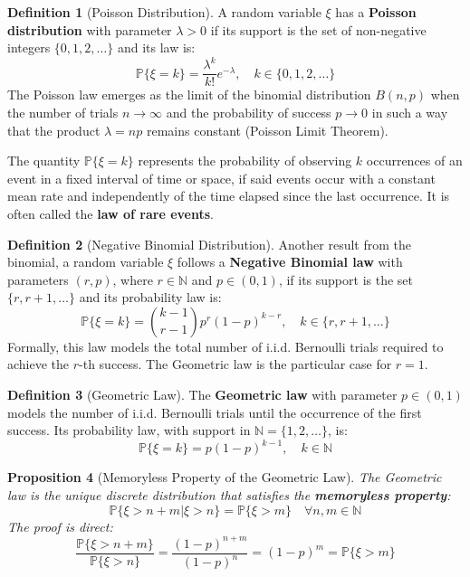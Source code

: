 \documentclass[12pt, openany]{book}
\theoremstyle{definition}
\newtheorem{definition}{Definition}[section]
\theoremstyle{plain}
\newtheorem{proposition}[definition]{Proposition}
\theoremstyle{remark}
\newcommand{\N}{\mathbb{N}}
\newcommand{\probP}{\mathbb{P}}
\begin{document}
\begin{definition}[Poisson Distribution]
A random variable $\xi$ has a \textbf{Poisson distribution} with parameter $\lambda > 0$ if its support is the set of non-negative integers $\{0, 1, 2, \dots\}$ and its law is:
$$ \probP\{\xi=k\} = \frac{\lambda^k}{k!} e^{-\lambda}, \quad k \in \{0, 1, 2, \dots\} $$
The Poisson law emerges as the limit of the binomial distribution $B(n,p)$ when the number of trials $n \to \infty$ and the probability of success $p \to 0$ in such a way that the product $\lambda = np$ remains constant (Poisson Limit Theorem).

\vspace{1em}
The quantity $\probP\{\xi=k\}$ represents the probability of observing $k$ occurrences of an event in a fixed interval of time or space, if said events occur with a constant mean rate and independently of the time elapsed since the last occurrence. It is often called the \textbf{law of rare events}.
\end{definition}

\begin{definition}[Negative Binomial Distribution]
Another result from the binomial, a random variable $\xi$ follows a \textbf{Negative Binomial law} with parameters $(r, p)$, where $r \in \mathbb{N}$ and $p \in (0,1)$, if its support is the set $\{r, r+1, \dots\}$ and its probability law is:
$$ \probP\{\xi=k\} = \binom{k-1}{r-1} p^r (1-p)^{k-r}, \quad k \in \{r, r+1, \dots\} $$
Formally, this law models the total number of i.i.d. Bernoulli trials required to achieve the $r$-th success. The Geometric law is the particular case for $r=1$.
\end{definition}

\begin{definition}[Geometric Law]
The \textbf{Geometric law} with parameter $p \in (0,1)$ models the number of i.i.d. Bernoulli trials until the occurrence of the first success. Its probability law, with support in $\mathbb{N}=\{1, 2, \dots\}$, is:
$$ \probP\{\xi=k\} = p(1-p)^{k-1}, \quad k \in \mathbb{N} $$
\end{definition}

\begin{proposition}[Memoryless Property of the Geometric Law]
The Geometric law is the unique discrete distribution that satisfies the \textbf{memoryless property}:
$$ \probP\{\xi > n+m | \xi > n\} = \probP\{\xi > m\} \quad \forall n, m \in \N $$
The proof is direct:
$$ \frac{\probP\{\xi > n+m\}}{\probP\{\xi > n\}} = \frac{(1-p)^{n+m}}{(1-p)^n} = (1-p)^m = \probP\{\xi > m\} $$
\end{proposition}
\end{document}
